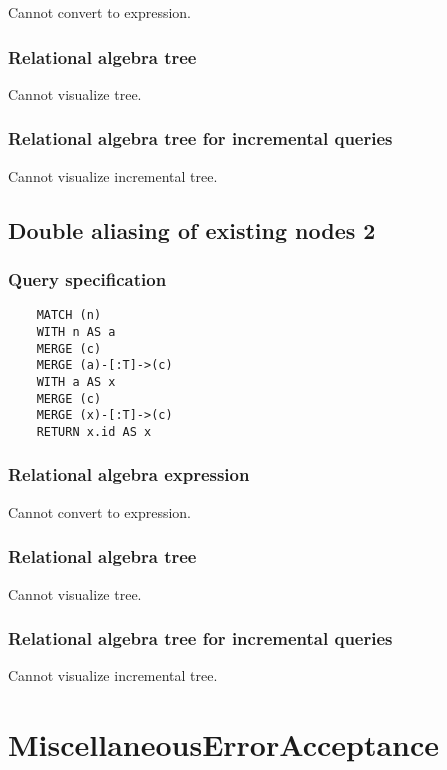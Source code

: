 	Cannot convert to expression.

	\subsubsection*{Relational algebra tree}

	Cannot visualize tree.

	\subsubsection*{Relational algebra tree for incremental queries}

	Cannot visualize incremental tree.
	\subsection{Double aliasing of existing nodes 2}

	\subsubsection*{Query specification}

	\begin{lstlisting}
	MATCH (n)
	WITH n AS a
	MERGE (c)
	MERGE (a)-[:T]->(c)
	WITH a AS x
	MERGE (c)
	MERGE (x)-[:T]->(c)
	RETURN x.id AS x
	\end{lstlisting}


	\subsubsection*{Relational algebra expression}

	Cannot convert to expression.

	\subsubsection*{Relational algebra tree}

	Cannot visualize tree.

	\subsubsection*{Relational algebra tree for incremental queries}

	Cannot visualize incremental tree.

	\section{MiscellaneousErrorAcceptance}


